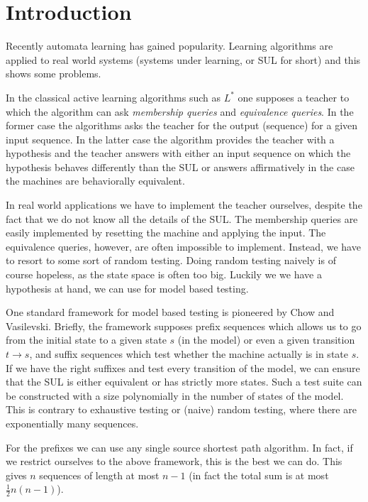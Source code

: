 \documentclass[envcountsame]{llncs}
\newcommand{\Def}[1]{\emph{#1}}
\begin{document}
\maketitle

\section{Introduction}

Recently automata learning has gained popularity. Learning algorithms are
applied to real world systems (systems under learning, or SUL for short) and
this shows some problems.

In the classical active learning algorithms such as $L^\ast$ one supposes a
teacher to which the algorithm can ask \Def{membership queries} and \Def{
equivalence queries}. In the former case the algorithms asks the teacher for the
output (sequence) for a given input sequence. In the latter case the algorithm
provides the teacher with a hypothesis and the teacher answers with either an
input sequence on which the hypothesis behaves differently than the SUL or
answers affirmatively in the case the machines are behaviorally equivalent.

In real world applications we have to implement the teacher ourselves, despite
the fact that we do not know all the details of the SUL. The membership queries
are easily implemented by resetting the machine and applying the input. The
equivalence queries, however, are often impossible to implement. Instead, we
have to resort to some sort of random testing. Doing random testing naively is
of course hopeless, as the state space is often too big. Luckily we we have a
hypothesis at hand, we can use for model based testing.

One standard framework for model based testing is pioneered by Chow and
Vasilevski. Briefly, the framework supposes prefix sequences which allows us to
go from the initial state to a given state $s$ (in the model) or even a given
transition $t \to s$, and suffix sequences which test whether the machine
actually is in state $s$. If we have the right suffixes and test every
transition of the model, we can ensure that the SUL is either equivalent or has
strictly more states. Such a test suite can be constructed with a size
polynomially in the number of states of the model. This is contrary to
exhaustive testing or (naive) random testing, where there are exponentially many
sequences.

For the prefixes we can use any single source shortest path algorithm. In fact,
if we restrict ourselves to the above framework, this is the best we can do.
This gives $n$ sequences of length at most $n-1$ (in fact the total sum is at
most $\frac{1}{2}n(n-1)$).
\end{document}
